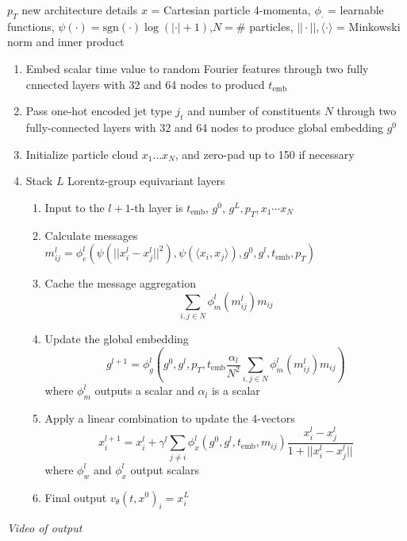 \documentclass[handout, aspectratio=169,xcolor=dvipsnames]{beamer}
\begin{document}
\begin{frame}[allowframebreaks]{$p_T$ new architecture details}
    $x$ = Cartesian particle 4-momenta, $\phi_\cdot$ = learnable functions, $\psi(\cdot) = \text{sgn}(\cdot) \log(|\cdot| + 1)$,$N = \#$ particles, $|| \cdot ||, \langle \cdot \rangle$ = Minkowski norm and inner product
    \begin{enumerate}
        \item Embed scalar time value to random Fourier features through two fully cnnected layers with 32 and 64 nodes to producd $t_\text{emb}$
        \item Pass one-hot encoded jet type $j_t$ and number of constituents $N$ through two fully-connected layers with 32 and 64 nodes to produce global embedding $g^0$
        \item Initialize particle cloud $x_1 \dots x_N$, and zero-pad up to 150 if necessary
        \item Stack $L$ Lorentz-group equivariant layers \begin{enumerate}
            \item Input to the $l+1$-th layer is $t_\text{emb}$, $g^0$, $g^L, p_T, x_1 \cdots x_N$
            \item Calculate messages $m_{ij}^l = \phi_e^l(\psi(||x_i^l - x_j^l||^2), \psi(\langle x_i, x_j \rangle), g^0, g^l, t_\text{emb}, p_T)$
            \item Cache the message aggregation $$\sum\limits_{i, j \in N} \phi_m^l(m_{ij}^l) m_{ij} $$
            \item Update the global embedding $$g^{l+1} = \phi_g^l \left(g^0, g^l, p_T, t_\text{emb} \frac{\alpha_l}{N^2} \sum\limits_{i, j \in N} \phi_m^l(m_{ij}^l) m_{ij}  \right)$$ where $\phi_m^l$ outputs a scalar and $\alpha_l$ is a scalar
            \item Apply a linear combination to update the 4-vectors $$x_i^{l+1} = x_i^l + \gamma^l \sum\limits_{j \neq i} \phi_x^l (g^0, g^l, t_\text{emb}, m_{ij}) \frac{x_i^l - x_j^l}{1 + ||x_i^l - x_j^l||} $$  where $\phi_w^l$ and $\phi_x^l$ output scalars
            \item Final output $v_\theta(t, x^0)_i = x_i^L$
        \end{enumerate}
    \end{enumerate}
\end{frame}

\begin{frame}
    \begin{center}
        \textit{Video of output}
    \end{center}
\end{frame}
\end{document}
